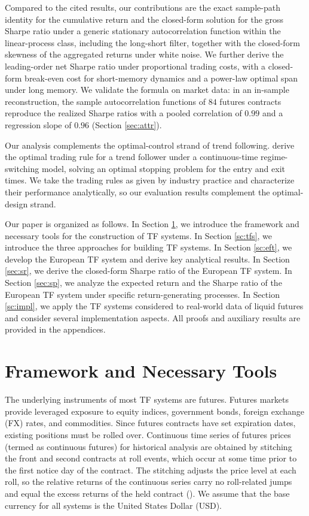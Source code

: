 \documentclass[hidelinks]{siamonline250211}
\begin{document}
Compared to the cited results, our contributions are the exact sample-path identity for the cumulative return and the closed-form solution for the gross Sharpe ratio under a generic stationary autocorrelation function within the linear-process class, including the long-short filter, together with the closed-form skewness of the aggregated returns under white noise. We further derive the leading-order net Sharpe ratio under proportional trading costs, with a closed-form break-even cost for short-memory dynamics and a power-law optimal span under long memory. We validate the formula on market data: in an in-sample reconstruction, the sample autocorrelation functions of $84$ futures contracts reproduce the realized Sharpe ratios with a pooled correlation of $0.99$ and a regression slope of $0.96$ (Section \ref{sec:attr}).


Our analysis complements the optimal-control strand of trend following. \cite{DaiZhangZhu2010} derive the optimal trading rule for a trend follower under a continuous-time regime-switching model, solving an optimal stopping problem for the entry and exit times. We take the trading rules as given by industry practice and characterize their performance analytically, so our evaluation results complement the optimal-design strand.

Our paper is organized as follows. In Section \ref{sc:frm}, we introduce the framework and necessary tools for the construction of TF systems. In Section \ref{sc:tfs}, we introduce the three approaches for building TF systems. In Section \ref{sc:eft}, we develop the European TF system and derive key analytical results. In Section \ref{sec:sr}, we derive the closed-form Sharpe ratio of the European TF system. In Section \ref{sec:sp}, we analyze the expected return and the Sharpe ratio of the European TF system under specific return-generating processes. In Section \ref{sc:impl}, we apply the TF systems considered to real-world data of liquid futures and consider several implementation aspects. All proofs and auxiliary results are provided in the appendices.




\section{Framework and Necessary Tools}\label{sc:frm}


The underlying instruments of most TF systems are futures. Futures markets provide leveraged exposure to equity indices, government bonds, foreign exchange (FX) rates, and commodities. Since futures contracts have set expiration dates, existing positions must be rolled over. Continuous time series of futures prices (termed as continuous futures) for historical analysis are obtained by stitching the front and second contracts at roll events, which occur at some time prior to the first notice day of the contract. The stitching adjusts the price level at each roll, so the relative returns of the continuous series carry no roll-related jumps and equal the excess returns of the held contract (\citealp{Carver2023}). We assume that the base currency for all systems is the United States Dollar (USD).
\end{document}
